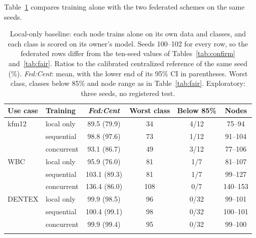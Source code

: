 \documentclass[pdflatex,sn-mathphys-num]{sn-jnl}
\newcommand{\fedcent}{\textit{Fed:Cent}}
\begin{document}
Table~\ref{tab:local} compares training alone with the two federated schemes on the same seeds.

\begin{table}[t]
\caption{Local-only baseline: each node trains alone on its own data and classes, and each class is scored on its owner's model. Seeds 100--102 for every row, so the federated rows differ from the ten-seed values of Tables~\ref{tab:confirm} and~\ref{tab:fair}. Ratios to the calibrated centralized reference of the same seed (\%). \fedcent{}: mean, with the lower end of its 95\% CI in parentheses. Worst class, classes below 85\% and node range as in Table~\ref{tab:fair}. Exploratory: three seeds, no registered test.}\label{tab:local}
\footnotesize
\begin{tabular*}{\textwidth}{@{\extracolsep\fill}llcccc}
\toprule
Use case & Training & \fedcent{} & Worst class & Below 85\% & Nodes \\
\midrule
kfm12 & local only & 89.5 (79.9) & 34 & 4/12 & 75--94 \\
 & sequential & 98.8 (97.6) & 73 & 1/12 & 91--104 \\
 & concurrent & 93.1 (86.7) & 49 & 3/12 & 77--106 \\
\midrule
WBC & local only & 95.9 (76.0) & 81 & 1/7 & 81--107 \\
 & sequential & 103.1 (89.3) & 81 & 1/7 & 99--127 \\
 & concurrent & 136.4 (86.0) & 108 & 0/7 & 140--153 \\
\midrule
DENTEX & local only & 99.9 (98.5) & 96 & 0/32 & 99--101 \\
 & sequential & 100.4 (99.1) & 98 & 0/32 & 100--101 \\
 & concurrent & 99.9 (99.4) & 95 & 0/32 & 99--100 \\
\botrule
\end{tabular*}
\end{table}
\end{document}
